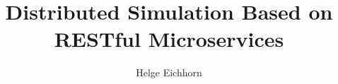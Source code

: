 \documentclass[draft=true, twoside]{scrbook}
\begin{document}
\frontmatter
\title{Distributed Simulation Based on RESTful Microservices}
\author{Helge Eichhorn}
\maketitle




\tableofcontents
\listoffigures
\listoftables


\mainmatter








\printbibliography[heading=bibintoc]
\appendix
\end{document}
